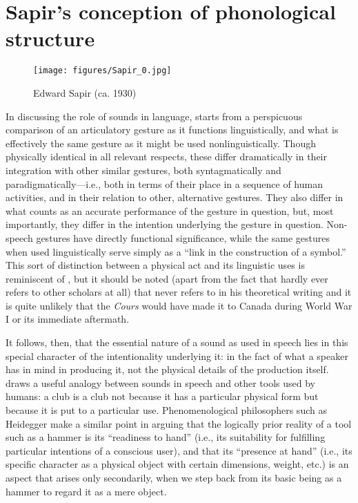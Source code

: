 \section{Sapir's conception of phonological structure}

\begin{wrapfigure}{r}{.3\textwidth}
  \texttt{[image: figures/Sapir\_0.jpg]}
  \caption{Edward Sapir (ca. 1930)}
  \label{fig:ch.sapir.sapir_stock}
\end{wrapfigure}
In discussing the role of sounds in language, {\Sapir} starts from a
perspicuous comparison of an articulatory gesture as it functions
linguistically, and what is effectively the same gesture as it might
be used nonlinguistically. Though physically identical in all relevant
respects, these differ dramatically in their integration with other
similar gestures, both syntagmatically and paradigmatically—i.e., both
in terms of their place in a sequence of human activities, and in
their relation to other, alternative gestures. They also differ in
what counts as an accurate {performance} of the gesture in question,
but, most importantly, they differ in the intention underlying the
gesture in question. Non-speech gestures have directly functional
significance, while the same gestures when used linguistically serve
simply as a ``link in the construction of a symbol.'' This sort of
distinction between a physical act and its linguistic uses is
reminiscent of {\Saussure}, but it should be noted (apart from the fact
that {\Sapir} hardly ever refers to other scholars at all) that {\Sapir}
never refers to {\Saussure} in his theoretical writing and it is quite
unlikely that the \textsl{Cours} would have made it to Canada during
World War I or its immediate aftermath.

It follows, then, that the essential nature of a sound as used in
speech lies in this special character of the intentionality underlying
it: in the fact of what a speaker has in mind in producing it, not the
physical details of the production itself. {\Sapir} draws a useful
{analogy} between sounds in speech and other tools used by humans: a
club is a club not because it has a particular physical form but
because it is put to a particular use. Phenomenological philosophers
such as Heidegger make a similar point in arguing that the logically
prior reality of a tool such as a hammer is its ``readiness to hand''
(i.e., its suitability for fulfilling particular intentions of a
conscious user), and that its ``presence at hand'' (i.e., its specific
character as a physical object with certain dimensions, weight, etc.)
is an aspect that arises only secondarily, when we step back from its
basic being as a hammer to regard it as a mere object.

